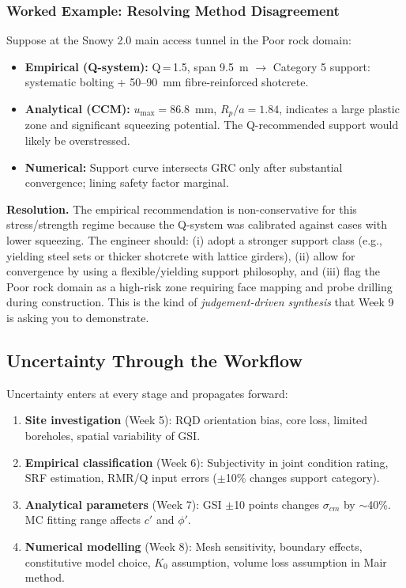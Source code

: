 \documentclass[a4paper,12pt]{article}
\begin{document}
\subsubsection{Worked Example: Resolving Method Disagreement}

Suppose at the Snowy 2.0 main access tunnel in the Poor rock domain:
\begin{itemize}[nosep]
    \item \textbf{Empirical (Q-system):} Q\,=\,1.5, span 9.5~m $\to$ Category 5 support: systematic bolting + 50--90~mm fibre-reinforced shotcrete.
    \item \textbf{Analytical (CCM):} $u_{\max} = 86.8$~mm, $R_p/a = 1.84$, indicates a large plastic zone and significant squeezing potential. The Q-recommended support would likely be overstressed.
    \item \textbf{Numerical:} Support curve intersects GRC only after substantial convergence; lining safety factor marginal.
\end{itemize}

\noindent \textbf{Resolution.} The empirical recommendation is non-conservative for this stress/strength regime because the Q-system was calibrated against cases with lower squeezing. The engineer should: (i) adopt a stronger support class (e.g., yielding steel sets or thicker shotcrete with lattice girders), (ii) allow for convergence by using a flexible/yielding support philosophy, and (iii) flag the Poor rock domain as a high-risk zone requiring face mapping and probe drilling during construction. This is the kind of \textit{judgement-driven synthesis} that Week 9 is asking you to demonstrate.

\subsection{Uncertainty Through the Workflow}

Uncertainty enters at every stage and propagates forward:

\begin{enumerate}
    \item \textbf{Site investigation} (Week 5): RQD orientation bias, core loss, limited boreholes, spatial variability of GSI.
    \item \textbf{Empirical classification} (Week 6): Subjectivity in joint condition rating, SRF estimation, RMR/Q input errors ($\pm$10\% changes support category).
    \item \textbf{Analytical parameters} (Week 7): GSI $\pm$10 points changes $\sigma_{cm}$ by $\sim$40\%. MC fitting range affects $c'$ and $\phi'$.
    \item \textbf{Numerical modelling} (Week 8): Mesh sensitivity, boundary effects, constitutive model choice, $K_0$ assumption, volume loss assumption in Mair method.
\end{enumerate}
\end{document}

